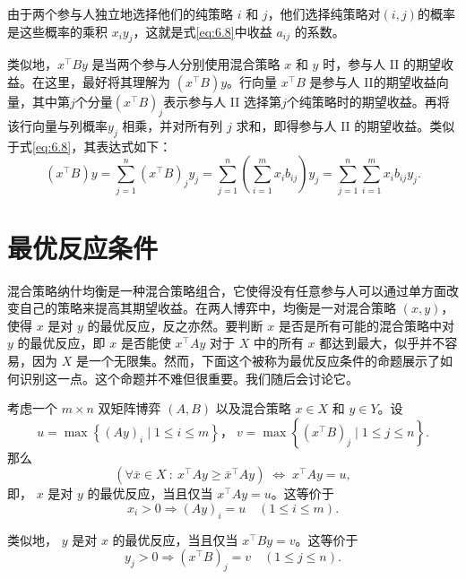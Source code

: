 由于两个参与人独立地选择他们的纯策略 \(i\) 和 \(j\)，他们选择纯策略对$(i, j)$的概率是这些概率的乘积 \({x}_{i}{y}_{j}\)，这就是式\eqref{eq:6.8}中收益 \({a}_{ij}\) 的系数。

类似地，\({x}^{\top }{By}\) 是当两个参与人分别使用混合策略 \(x\) 和 \(y\) 时，参与人 II 的期望收益。在这里，最好将其理解为 \(\left( {{x}^{\top }B}\right) y\)。行向量 \({x}^{\top }B\) 是参与人 II的期望收益向量，其中第\(j\)个分量\({\left( {x}^{\top }B\right) }_{j}\)表示参与人 II 选择第\(j\)个纯策略时的期望收益。再将该行向量与列概率\({y}_{j}\) 相乘，并对所有列 \(j\) 求和，即得参与人 II 的期望收益。类似于式\eqref{eq:6.8}，其表达式如下：
\[
\left( {{x}^{\top }B}\right) y = \mathop{\sum }\limits_{{j = 1}}^{n}{\left( {x}^{\top }B\right) }_{j}{y}_{j} = \mathop{\sum }\limits_{{j = 1}}^{n}\left( {\mathop{\sum }\limits_{{i = 1}}^{m}{x}_{i}{b}_{ij}}\right) {y}_{j} = \mathop{\sum }\limits_{{j = 1}}^{n}\mathop{\sum }\limits_{{i = 1}}^{m}{x}_{i}{b}_{ij}{y}_{j}.
\]

\section{最优反应条件}  \label{sec6.4}

混合策略纳什均衡是一种混合策略组合，它使得没有任意参与人可以通过单方面改变自己的策略来提高其期望收益。在两人博弈中，均衡是一对混合策略 $(x, y)$，使得 \(x\) 是对 \(y\) 的最优反应，反之亦然。要判断 \(x\) 是否是所有可能的混合策略中对 \(y\) 的最优反应，即 \(x\) 是否能使 \({x}^{\top }{Ay}\) 对于 \(X\) 中的所有 \(x\) 都达到最大，似乎并不容易，因为 \(X\) 是一个无限集。然而，下面这个被称为最优反应条件的命题展示了如何识别这一点。这个命题并不难但很重要。我们随后会讨论它。

\begin{proposition}[两人博弈的最优反应条件] \label{prop:6.1}
考虑一个 \(m \times  n\) 双矩阵博弈 $(A, B)$ 以及混合策略 \(x \in  X\) 和 \(y \in  Y\)。设
\begin{equation} \label{eq:6.9}
u = \max \left\{  {{\left( Ay\right) }_{i} \mid  1 \leq  i \leq  m}\right\} ，\;v = \max \left\{  {{\left( {x}^{\top }B\right) }_{j} \mid  1 \leq  j \leq  n}\right\}.
\end{equation}
那么
\begin{equation} \label{eq:6.10}
\left( {\forall \bar{x} \in  X ~:~ {x}^{\top }{Ay} \geq  {\bar{x}}^{\top }{Ay}}\right) \; \Leftrightarrow  \;{x}^{\top }{Ay} = u,
\end{equation}
即， \(x\) 是对 \(y\) 的最优反应，当且仅当 \({x}^{\top }{Ay} = u\)。这等价于
\begin{equation} \label{eq:6.11}
{x}_{i} > 0 \Rightarrow  {\left( Ay\right) }_{i} = u \quad \left( {1 \leq  i \leq  m}\right).
\end{equation}

类似地， \(y\) 是对 \(x\) 的最优反应，当且仅当 \({x}^{\top }{By} = v\)。这等价于
\begin{equation} \label{eq:6.12}
{y}_{j} > 0 \Rightarrow  {\left( {x}^{\top }B\right) }_{j} = v \quad \left( {1 \leq  j \leq  n}\right) .
\end{equation}
\end{proposition}

